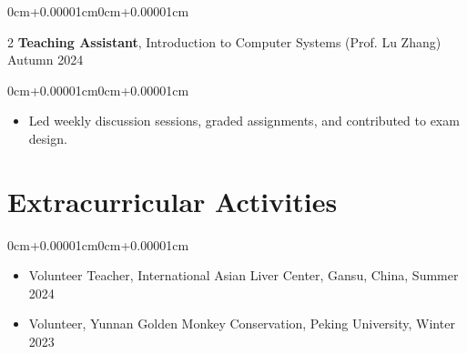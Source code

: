 \documentclass[10pt, letterpaper]{article}
\newenvironment{highlights}{\begin{itemize}[topsep=0.10cm,parsep=0.10cm,partopsep=0pt,itemsep=0pt,leftmargin=0cm+10pt]}{\end{itemize}}
\newenvironment{onecolentry}{\begin{adjustwidth}{0cm+0.00001cm}{0cm+0.00001cm}}{\end{adjustwidth}}
\newenvironment{twocolentry}[2][]{\onecolentry\def\secondColumn{#2}\setcolumnwidth{\fill, 4.5cm}\begin{paracol}{2}}{\switchcolumn \raggedleft \secondColumn\end{paracol}\endonecolentry}
\begin{document}
    \vspace{0.2cm}

    \begin{twocolentry}{Autumn 2024}
        \textbf{Teaching Assistant}, Introduction to Computer Systems (Prof. Lu Zhang)
    \end{twocolentry}
    \vspace{0.10cm}
    \begin{onecolentry}
        \begin{highlights}
            \item Led weekly discussion sessions, graded assignments, and contributed to exam design.
        \end{highlights}
    \end{onecolentry}

    \section{Extracurricular Activities}

    \begin{onecolentry}
        \begin{highlights}
            \item Volunteer Teacher, International Asian Liver Center, Gansu, China, Summer 2024
            \item Volunteer, Yunnan Golden Monkey Conservation, Peking University, Winter 2023
        \end{highlights}
    \end{onecolentry}
\end{document}
